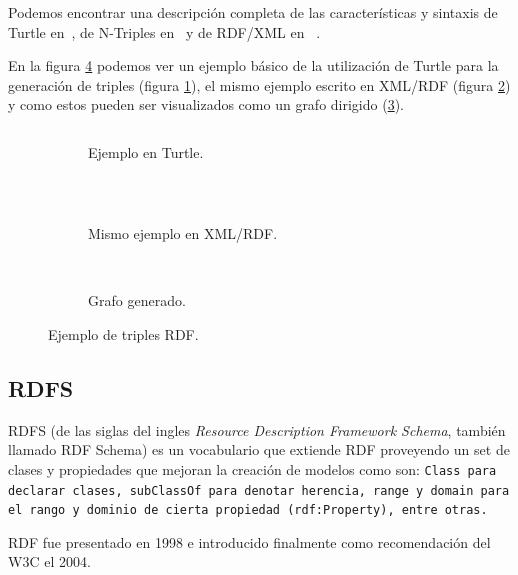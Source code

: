 Podemos encontrar una descripción completa de las características y sintaxis de
Turtle en~\cite{beckett2014turtle}, de N-Triples en~\cite{beckett2014nt} y de
RDF/XML en ~\cite{beckett2004rdf}.

En la figura \ref{fig:triples} podemos ver un ejemplo básico de la utilización 
de Turtle para la generación de triples (figura \ref{fig:triples:ttl}), el
mismo ejemplo escrito en XML/RDF (figura \ref{fig:triples:rdf}) y como estos
pueden ser visualizados como un grafo dirigido (\ref{fig:triples:grafo}).
\begin{figure}[htpb]
  \centering
  \begin{subfigure}[b]{\textwidth}
    \centering
    \begin{tabular}{c}
      
    \end{tabular}
    \caption{Ejemplo en Turtle.}
    \label{fig:triples:ttl}
  \end{subfigure}
  \\[0.5cm]
  \begin{subfigure}[b]{\textwidth}
    \centering
    \begin{tabular}{c}
      
    \end{tabular}
    \caption{Mismo ejemplo en XML/RDF.}
    \label{fig:triples:rdf}
  \end{subfigure}
  \\[0.5cm]
  \begin{subfigure}[]{\textwidth}
    \centering
    
    \caption{Grafo generado.}
    \label{fig:triples:grafo}
  \end{subfigure}
  \caption{Ejemplo de triples RDF.}\label{fig:triples}
\end{figure}

\subsection{RDFS}
RDFS (de las siglas del ingles \emph{Resource Description Framework Schema},
también llamado RDF Schema) es un vocabulario que extiende RDF proveyendo un
set de clases y propiedades que mejoran la creación de modelos como son:
\tt{Class} para declarar clases, \tt{subClassOf} para denotar herencia,
\tt{range} y \tt{domain} para el rango y dominio de cierta propiedad
(\tt{rdf:Property}), entre otras.

RDF fue presentado en 1998 e introducido finalmente como recomendación del W3C
el 2004\cite{bikakis2013semantic}.

